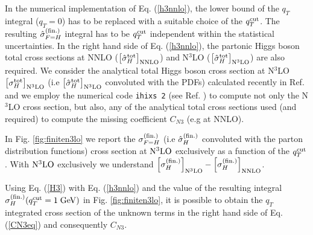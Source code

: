 \documentclass[12pt]{article}
\def\qt{q_T}
\begin{document}
In the numerical implementation of Eq. (\ref{h3nnlo}), the lower bound of the $\qt$ integral ($\qt=0$) has to be replaced with a suitable choice of the $\qt^{{\rm cut}}$. The resulting ${\hat \sigma}_{F=H}^{(\rm fin.)}$ integral has to be $\qt^{{\rm cut}}$ independent within the statistical uncertainties. In the right hand side of Eq.  (\ref{h3nnlo}), the partonic Higgs boson total cross sections at NNLO ($\bigl[ {\hat \sigma}_{H}^{{\rm {tot}}} \bigr]_{\rm NNLO}$) and N$^{3}$LO  ($\bigl[ {\hat \sigma}_{H}^{{\rm {tot}}} \bigr]_{\rm N^{3}LO}$) are also required. We consider the analytical total Higgs boson cross section at N$^{3}$LO $\bigl[  \sigma_{H}^{{\rm {tot}}} \bigr]_{\rm N^{3}LO}$ (i.e $\bigl[ {\hat \sigma}_{H}^{{\rm {tot}}} \bigr]_{\rm N^{3}LO}$ convoluted with the PDFs)  calculated recently in Ref. \cite{Mistlberger:2018etf} and we employ the numerical code \texttt{ihixs 2} (see Ref. \cite{Dulat:2018rbf}) to compute not only the N$^{3}$LO cross section, but also, any of the analytical total cross sections used (and required) to compute the missing coefficient $C_{N3}$ (e.g at NNLO).


In Fig. \ref{fig:finiten3lo} we report the $\sigma_{F=H}^{(\rm fin.)}$ (i.e ${\hat \sigma}_{H}^{(\rm fin.)}$ convoluted with the parton distribution functions) cross section at $\rm N^3LO$ exclusively as a function of the $q_{T}^{\rm cut}$. With $\rm N^3LO$ exclusively we understand  $\Bigl[ \sigma_{H}^{(\rm fin.)}\Bigr]_{\rm N^{3}LO} - \Bigl[ \sigma_{H}^{(\rm fin.)}\Bigr]_{\rm NNLO}$.  

Using Eq. (\ref{H3}) with Eq. (\ref{h3nnlo}) and the value of the resulting integral $ \sigma_{H}^{(\rm fin.)}(q_{T}^{\rm cut}=1\; {\rm GeV})$ in Fig. \ref{fig:finiten3lo}, it is possible to obtain the $\qt$ integrated cross section of the unknown terms in the right hand side of Eq. (\ref{CN3eq}) and consequently $C_{N3}$. 
\end{document}

